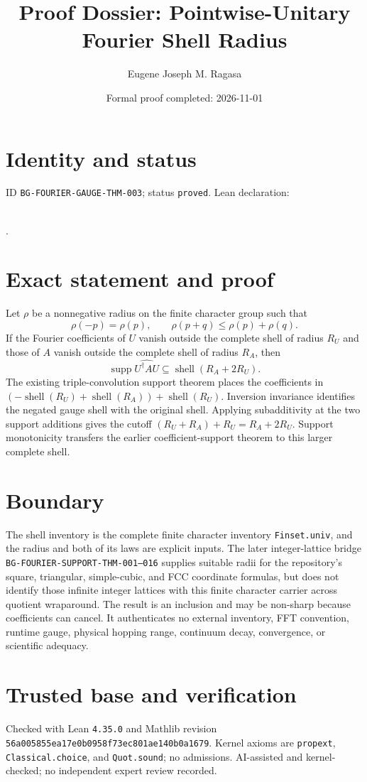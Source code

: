\documentclass[11pt]{article}
\title{Proof Dossier: Pointwise-Unitary Fourier Shell Radius}\author{Eugene Joseph M. Ragasa}\date{Formal proof completed: 2026-11-01}
\begin{document}
\maketitle
\section{Identity and status}
ID \texttt{BG-FOURIER-GAUGE-THM-003}; status \texttt{proved}. Lean declaration:
\par{}\\
{\tiny{}}.
\section{Exact statement and proof}
Let $\rho$ be a nonnegative radius on the finite character group such that
\[
 \rho(-p)=\rho(p),\qquad \rho(p+q)\leq \rho(p)+\rho(q).
\]
If the Fourier coefficients of $U$ vanish outside the complete shell of radius $R_U$ and those of
$A$ vanish outside the complete shell of radius $R_A$, then
\[
 \operatorname{supp}\widehat{U^\dagger A U}
 \subseteq \operatorname{shell}(R_A+2R_U).
\]
The existing triple-convolution support theorem places the coefficients in
$(-\operatorname{shell}(R_U)+\operatorname{shell}(R_A))+\operatorname{shell}(R_U)$.
Inversion invariance identifies the negated gauge shell with the original shell. Applying
subadditivity at the two support additions gives the cutoff
$(R_U+R_A)+R_U=R_A+2R_U$. Support monotonicity transfers the earlier coefficient-support theorem
to this larger complete shell.
\section{Boundary}
The shell inventory is the complete finite character inventory \texttt{Finset.univ}, and the radius
and both of its laws are explicit inputs. The later integer-lattice bridge
\texttt{BG-FOURIER-SUPPORT-THM-001--016} supplies suitable radii for the repository's square,
triangular, simple-cubic, and FCC coordinate formulas, but does not identify those infinite integer
lattices with this finite character carrier across quotient wraparound. The result is an inclusion
and may be non-sharp because coefficients can cancel. It authenticates no external
inventory, FFT convention, runtime gauge, physical hopping range, continuum decay, convergence, or
scientific adequacy.
\section{Trusted base and verification}
Checked with Lean \texttt{4.35.0} and Mathlib revision
\texttt{56a005855ea17e0b0958f73ec801ae140b0a1679}. Kernel axioms are
\texttt{propext}, \texttt{Classical.choice}, and \texttt{Quot.sound}; no admissions.
AI-assisted and kernel-checked; no independent expert review recorded.
\end{document}
